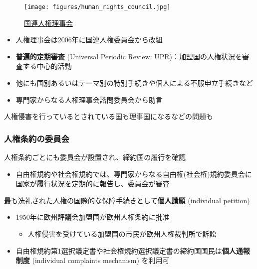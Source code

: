 \documentclass[
  xelatex,
  ja=standard]{bxjsarticle}
\providecommand{\tightlist}{%
  \setlength{\itemsep}{0pt}\setlength{\parskip}{0pt}}\usepackage{longtable,booktabs,array}
\begin{document}
\begin{figure}[htpb]

{\centering \texttt{[image: figures/human\_rights\_council.jpg]}

}

\caption{\href{https://commons.wikimedia.org/wiki/File:UN_Geneva_Human_Rights_and_Alliance_of_Civilizations_Room.jpg}{国連人権理事会}}

\end{figure}

\begin{itemize}
\tightlist
\item
  人権理事会は2006年に国連人権委員会から改組
\item
  \href{https://www.mofa.go.jp/mofaj/gaiko/jinken_r/upr_gai.html}{\textbf{普遍的定期審査}}
  (Universal Periodic Review: UPR)：加盟国の人権状況を審査する中心的活動
\item
  他にも国別あるいはテーマ別の特別手続きや個人による不服申立手続きなど
\item
  専門家からなる人権理事会諮問委員会から助言
\end{itemize}

人権侵害を行っているとされている国も理事国になるなどの問題も

\hypertarget{ux4ebaux6a29ux6761ux7d04ux306eux59d4ux54e1ux4f1a}{%
\subsubsection{人権条約の委員会}\label{ux4ebaux6a29ux6761ux7d04ux306eux59d4ux54e1ux4f1a}}

人権条約ごとにも委員会が設置され、締約国の履行を確認

\begin{itemize}
\tightlist
\item
  自由権規約や社会権規約では、専門家からなる自由権(社会権)規約委員会に国家が履行状況を定期的に報告し、委員会が審査
\end{itemize}

最も洗礼された人権の国際的な保障手続きとして\textbf{個人請願}
(individual petition)

\begin{itemize}
\tightlist
\item
  1950年に欧州評議会加盟国が欧州人権条約に批准

  \begin{itemize}
  \tightlist
  \item
    人権侵害を受けている加盟国の市民が欧州人権裁判所で訴訟
  \end{itemize}
\item
  自由権規約第1選択議定書や社会権規約選択議定書の締約国国民は\textbf{個人通報制度}
  (individual complaints mechanism) を利用可
\end{itemize}
\end{document}
